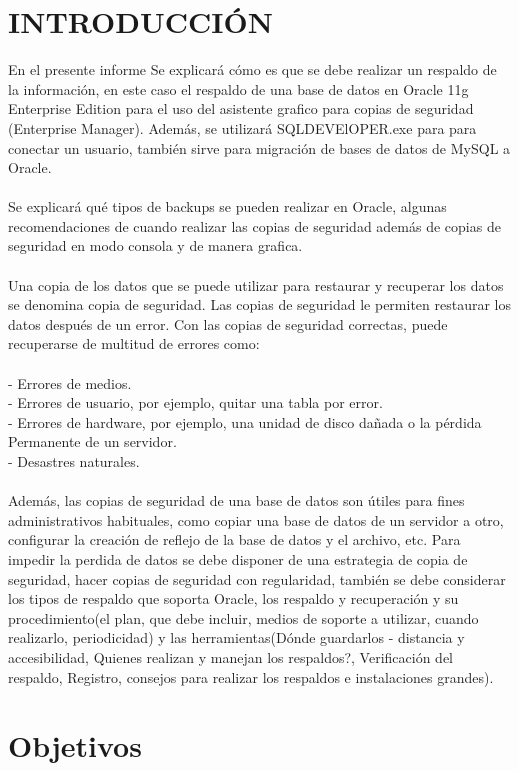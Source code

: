 \documentclass[12pt,letterpaper]{article}
\begin{document}
\section{INTRODUCCIÓN} 
En el presente informe Se explicará cómo es que se debe realizar un respaldo de la información, en este caso el respaldo de una base de datos en Oracle 11g Enterprise Edition para el uso del asistente grafico para copias de seguridad (Enterprise Manager).
Además, se utilizará SQLDEVElOPER.exe para para conectar un usuario, también sirve para migración de bases de datos de MySQL a Oracle.\\ \\
Se explicará qué tipos de backups se pueden realizar en Oracle, algunas recomendaciones de cuando realizar las copias de seguridad además de copias de seguridad en modo consola y de manera grafica. \\ \\
Una copia de los datos que se puede utilizar para restaurar y recuperar los datos se denomina copia de seguridad. Las copias de seguridad le permiten restaurar los datos después de un error. Con las copias de seguridad correctas, puede recuperarse de multitud de errores como:\\  \\
- Errores de medios.\\
- Errores de usuario, por ejemplo, quitar una tabla por error.\\
- Errores de hardware, por ejemplo, una unidad de disco dañada o la pérdida Permanente de un servidor.\\
- Desastres naturales.\\
\\
Además, las copias de seguridad de una base de datos son útiles para fines administrativos habituales, como copiar una base de datos de un servidor a otro, configurar la creación de reflejo de la base de datos y el archivo, etc.
Para impedir la perdida de datos se debe disponer de una estrategia de copia de seguridad, hacer copias de seguridad con regularidad, también se debe considerar los tipos de respaldo que soporta Oracle, los respaldo y recuperación y su procedimiento(el plan, que debe incluir, medios de soporte a utilizar, cuando realizarlo, periodicidad) y las herramientas(Dónde guardarlos - distancia y accesibilidad, Quienes realizan y manejan los  respaldos?, Verificación del respaldo, Registro, consejos para realizar los respaldos e instalaciones grandes).


 \newpage
\section{Objetivos} 
\end{document}
